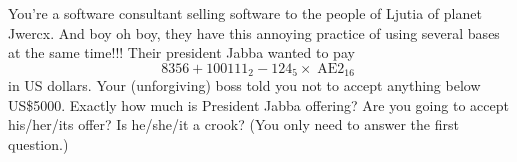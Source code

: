 You're a software consultant selling software to the people of
Ljutia of planet
Jwercx.
And boy oh boy, they have this annoying practice of using several bases at
the same time!!! Their president Jabba wanted to pay
\[
8356 + 100111_2 - 124_5 \times \operatorname{AE2}_{16}
\]
in US dollars.
Your (unforgiving) boss told you not to accept anything below
US\$5000.
Exactly how much is President Jabba offering?
Are you going to accept his/her/its offer?
Is he/she/it a crook? (You only need to answer the first question.)
